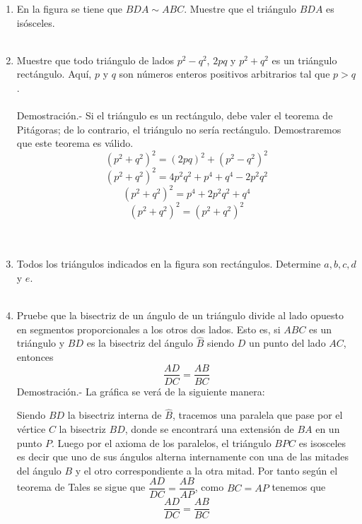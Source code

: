 \documentclass[10pt]{article}
\begin{document}
\begin{enumerate}
\item En la figura se tiene que $BDA \sim ABC$. Muestre que el triángulo $BDA$ es isósceles.\\\\

\item Muestre que todo triángulo de lados $p^2 - q^2$, $2pq$ y $p^2 + q^2$ es un triángulo rectángulo. Aquí, $p$ y $q$ son números enteros positivos arbitrarios tal que $p > q$.\\\\
    Demostración.-\; Si el triángulo es un rectángulo, debe valer el teorema de Pitágoras; de lo contrario, el triángulo no sería rectángulo. Demostraremos que este teorema es válido.
    $$(p^2 + q^2)^2 = (2pq)^2 + (p^2 - q^2)^2$$ $$(p^2+q^2)^2=4p^2q^2 + p^4 + q^4 - 2p^2q^2$$ 
    $$(p^2+q^2)^2=p^4 + 2p^2q^2 + q^4$$ $$(p^2 + q^2)^2=(p^2 + q^2)^2$$\\\\

\item Todos los triángulos indicados en la figura son rectángulos. Determine $a, b, c, d$ y $e$.\\\\

\item  Pruebe que la bisectriz de un ángulo de un triángulo divide al lado opuesto en segmentos proporcionales a los otros dos lados. Esto es, si $ABC$ es un triángulo y $BD$ es la bisectriz del ángulo $\widehat{B}$ siendo $D$ un punto del lado $AC$, entonces $$\dfrac{AD}{DC}=\dfrac{AB}{BC}$$
    Demostración.-\; La gráfica se verá de la siguiente manera:\\
\begin{center}
\end{center}
Siendo $BD$ la bisectriz interna de $\widehat{B}$, tracemos una paralela que pase por el vértice $C$ la bisectriz $BD$, donde se encontrará una extensión de $BA$ en un punto $P$. Luego por el axioma de los paralelos, el triángulo $BPC$ es isosceles es decir que uno de sus ángulos alterna internamente con una de las mitades del ángulo $B$ y el otro correspondiente a la otra mitad. Por tanto según el teorema de Tales se sigue que $\dfrac{AD}{DC}=\dfrac{AB}{AP}$, como $BC=AP$ tenemos que $$\dfrac{AD}{DC}=\dfrac{AB}{BC}$$\\\\


\end{enumerate}
\end{document}
